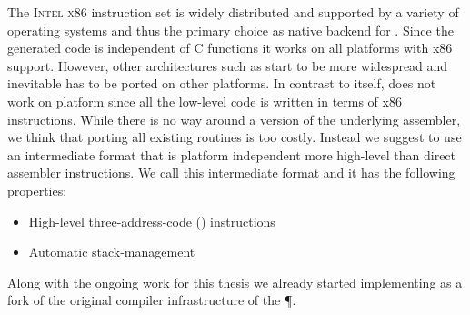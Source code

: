 The \textsc{Intel x86} instruction set is widely distributed and supported by a variety of operating systems and thus the primary choice as native backend for \B.
Since the generated code is independent of C functions it works on all platforms with x86 support.
However, other architectures such as \ARM start to be more widespread and inevitable \B has to be ported on other platforms.
In contrast to \PH itself, \B does not work on \ARM platform since all the low-level code is written in terms of x86 instructions.
While there is no way around a \ARM version of the underlying assembler, we think that porting all existing \B routines is too costly.
Instead we suggest to use an intermediate format that is platform independent more high-level than direct assembler instructions.
We call this intermediate format \VCPU and it has the following properties:
%
\begin{itemize}[noitemsep]
	\item High-level three-address-code (\TAC) instructions
	\item Automatic stack-management
\end{itemize}
%
Along with the ongoing work for this thesis we already started implementing \VCPU as a fork of the original compiler infrastructure of the \P \VM.

